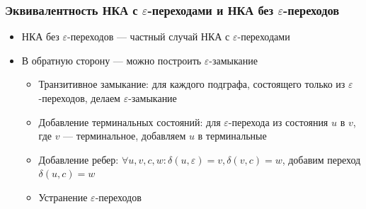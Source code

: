 \documentclass{beamer}
\begin{document}
\begin{frame}[fragile]
  \transwipe[direction=90]
  \frametitle{Эквивалентность НКА с $\varepsilon$-переходами и НКА без $\varepsilon$-переходов }
  \begin{itemize}
    \item НКА без $\varepsilon$-переходов --- частный случай НКА с $\varepsilon$-переходами
    \item В обратную сторону --- можно построить $\varepsilon$-замыкание
    \begin{itemize}
      \item Транзитивное замыкание: для каждого подграфа, состоящего только из $\varepsilon$-переходов, делаем $\varepsilon$-замыкание
      \item Добавление терминальных состояний: для $\varepsilon$-перехода из состояния $u$ в $v$, где $v$ --- терминальное, добавляем $u$ в терминальные
      \item Добавление ребер: $\forall u, v, c, w: \delta(u,\varepsilon)=v, \delta(v,c)=w$, добавим переход $\delta(u,c)=w$
      \item Устранение $\varepsilon$-переходов
    \end{itemize}
  \end{itemize}
\end{frame}
\end{document}
